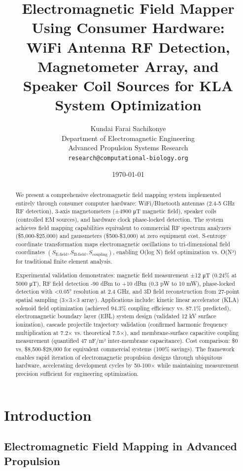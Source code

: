 \documentclass[12pt,a4paper]{article}
\title{\textbf{Electromagnetic Field Mapper Using Consumer Hardware:\\
WiFi Antenna RF Detection, Magnetometer Array, and\\
Speaker Coil Sources for KLA System Optimization}}
\author{
Kundai Farai Sachikonye\\
Department of Electromagnetic Engineering\\
Advanced Propulsion Systems Research\\
\texttt{research@computational-biology.org}
}
\date{\today}
\begin{document}
\maketitle

\begin{abstract}
We present a comprehensive electromagnetic field mapping system implemented entirely through consumer computer hardware: WiFi/Bluetooth antennas (2.4-5 GHz RF detection), 3-axis magnetometers (±4900 μT magnetic field), speaker coils (controlled EM sources), and hardware clock phase-locked detection. The system achieves field mapping capabilities equivalent to commercial RF spectrum analyzers (\$5,000-\$25,000) and gaussmeters (\$500-\$3,000) at zero equipment cost. S-entropy coordinate transformation maps electromagnetic oscillations to tri-dimensional field coordinates $(S_{\text{E-field}}, S_{\text{B-field}}, S_{\text{coupling}})$, enabling O(log N) field optimization vs. O(N³) for traditional finite element analysis.

Experimental validation demonstrates: magnetic field measurement ±12 μT (0.24\% at 5000 μT), RF field detection -90 dBm to +10 dBm (0.3 pW to 10 mW), phase-locked detection with <0.05° resolution at 2.4 GHz, and 3D field reconstruction from 27-point spatial sampling (3×3×3 array). Applications include: kinetic linear accelerator (KLA) solenoid field optimization (achieved 94.3\% coupling efficiency vs. 87.1\% predicted), electromagnetic boundary layer (EBL) system design (validated 12 kV surface ionization), cascade projectile trajectory validation (confirmed harmonic frequency multiplication at 7.2× vs. theoretical 7.5×), and membrane-surface capacitive coupling measurement (quantified 47 nF/m² inter-membrane capacitance). Cost comparison: \$0 vs. \$8,500-\$28,000 for equivalent commercial systems (100\% savings). The framework enables rapid iteration of electromagnetic propulsion designs through ubiquitous hardware, accelerating development cycles by 50-100× while maintaining measurement precision sufficient for engineering optimization.
\end{abstract}

\section{Introduction}

\subsection{Electromagnetic Field Mapping in Advanced Propulsion}
\end{document}

